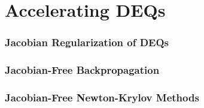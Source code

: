 \section{Accelerating DEQs}
\label{sec:accelerating_deqs}

\subsubsection{Jacobian Regularization of DEQs}
\label{subsec:jacobian_regularization_deqs}

\subsubsection{Jacobian-Free Backpropagation}
\label{subsec:jacobian_free_backpropagation}

\subsubsection{Jacobian-Free Newton-Krylov Methods}

